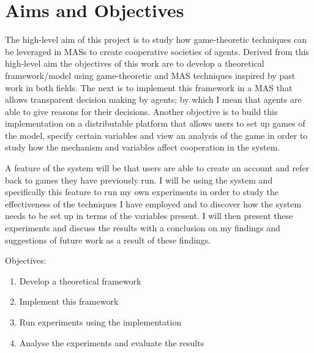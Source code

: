 \documentclass[]{final_report}
\begin{document}
\section{Aims and Objectives}
\label{sec:aao}
The high-level aim of this project is to study how game-theoretic techniques can be leveraged in MASs to create cooperative societies of agents. Derived from this high-level aim the objectives of this work are to develop a theoretical framework/model using game-theoretic and MAS techniques inspired by past work in both fields. The next is to implement this framework in a MAS that allows transparent decision making by agents; by which I mean that agents are able to give reasons for their decisions. Another objective is to build this implementation on a distributable platform that allows users to set up games of the model, specify certain variables and view an analysis of the game in order to study how the mechanism and variables affect cooperation in the system.\par
A feature of the system will be that users are able to create an account and refer back to games they have previously run. I will be using the system and specifically this feature to run my own experiments in order to study the effectiveness of the techniques I have employed and to discover how the system needs to be set up in terms of the variables present. I will then present these experiments and discuss the results with a conclusion on my findings and suggestions of future work as a result of these findings.\par
Objectives:
\begin{enumerate}
	\item Develop a theoretical framework
	\item Implement this framework
	\item Run experiments using the implementation
	\item Analyse the experiments and evaluate the results
\end{enumerate}
\end{document}
